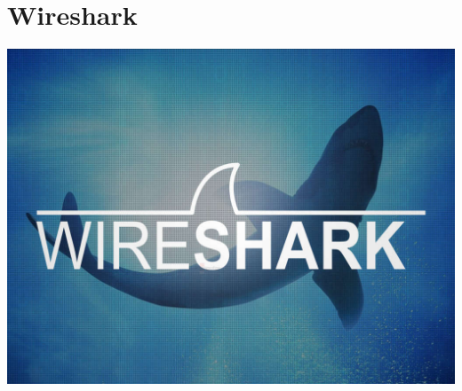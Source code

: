\documentclass[xcolor=dvipsnames, aspectratio=169]{beamer}
\begin{document}
\section{Wireshark}
\begin{frame}
\centering
\includegraphics[scale=0.3]{wireshark_s}
\end{frame}
\end{document}

